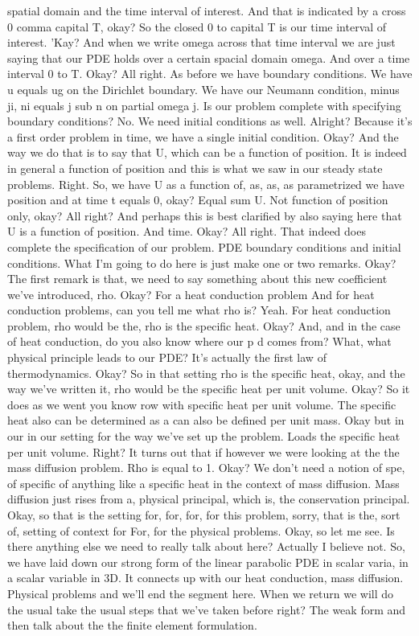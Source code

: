 \documentclass[10pt]{article}
\begin{document}
spatial domain and the time interval of interest. And that is indicated by a cross 0 comma capital T, okay? So the closed 0 to capital T is our time interval of interest. 'Kay? And when we write omega across that time interval we are just saying that our PDE holds over a certain spacial domain omega. And over a time interval 0 to T. Okay? All right. As before we have boundary conditions. We have u equals ug on the Dirichlet boundary. We have our Neumann condition, minus ji, ni equals j sub n on partial omega j. Is our problem complete with specifying boundary conditions? No. We need initial conditions as well. Alright? Because it's a first order problem in time, we have a single initial condition. Okay? And the way we do that is to say that U, which can be a function of position. It is indeed in general a function of position and this is what we saw in our steady state problems. Right. So, we have U as a function of, as, as, as parametrized we have position and at time t equals 0, okay? Equal sum U. Not function of position only, okay? All right? And perhaps this is best clarified by also saying here that U is a function of position. And time. Okay? All right. That indeed does complete the specification of our problem. PDE boundary conditions and initial conditions. What I'm going to do here is just make one or two remarks. Okay? The first remark is that, we need to say something about this new coefficient we've introduced, rho. Okay? For a heat conduction problem And for heat conduction problems, can you tell me what rho is? Yeah. For heat conduction problem, rho would be the, rho is the specific heat.  Okay? And, and in the case of heat conduction, do you also know where our p d comes from? What, what physical principle leads to our PDE? It's actually the first law of thermodynamics. Okay? So in that setting rho is the specific heat, okay, and the way we've written it, rho would be the specific heat per unit volume. Okay? So it does as we went you know row with specific heat per unit volume. The specific heat also can be determined as a can also be defined per unit mass. Okay but in our in our setting for the way we've set up the problem. Loads the specific heat per unit volume. Right? It turns out that if however we were looking at the the mass diffusion problem. Rho is equal to 1. Okay? We don't need a notion of spe, of specific of anything like a specific heat in the context of mass diffusion. Mass diffusion just rises from a, physical principal, which is, the conservation principal. Okay, so that is the setting for, for, for, for this problem, sorry, that is the, sort of, setting of context for For, for the physical problems. Okay, so let me see. Is there anything else we need to really talk about here? Actually I believe not. So, we have laid down our strong form of the linear parabolic PDE in scalar varia, in a scalar variable in 3D. It connects up with our heat conduction, mass diffusion. Physical problems and  we'll end the segment here. When we return we will do the usual take the usual steps that we've taken before right? The weak form and then talk about the the finite element formulation.
\end{document}
